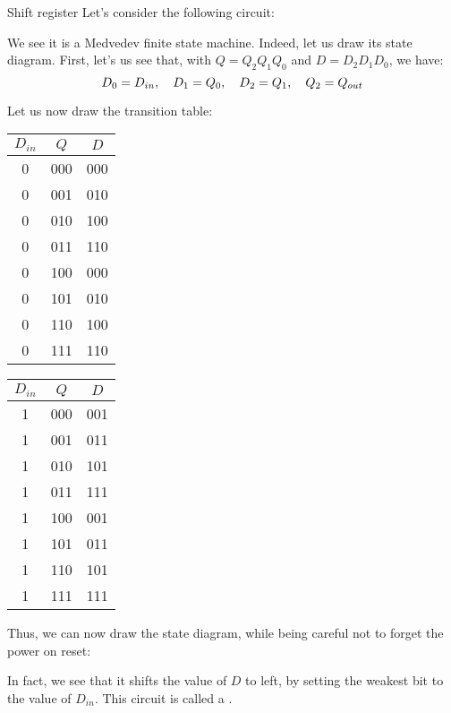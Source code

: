 \documentclass[a4paper]{article}
\begin{document}
\begin{parag}{Shift register}
    Let's consider the following circuit:

    We see it is a Medvedev finite state machine. Indeed, let us draw its state diagram. First, let's us see that, with $Q = Q_2 Q_1 Q_0$ and $D = D_2 D_1 D_0$, we have:
    \[D_0 = D_{in}, \quad D_1 = Q_0, \quad D_2 = Q_1, \quad Q_2 = Q_{out}\]

    Let us now draw the transition table:
    \begin{center}
    \begin{tabular}{cc|c}
        $D_{in}$ & $Q$ & $D$ \\
        \hline
        0 & 000 & 000 \\
        0 & 001 & 010 \\
        0 & 010 & 100 \\
        0 & 011 & 110 \\
        0 & 100 & 000 \\
        0 & 101 & 010 \\
        0 & 110 & 100 \\
        0 & 111 & 110 \\
    \end{tabular}
    \hspace{1em}
    \begin{tabular}{cc|c}
        $D_{in}$ & $Q$ & $D$ \\
        \hline
        1 & 000 & 001 \\
        1 & 001 & 011 \\
        1 & 010 & 101 \\
        1 & 011 & 111 \\
        1 & 100 & 001 \\
        1 & 101 & 011 \\
        1 & 110 & 101 \\
        1 & 111 & 111 \\
    \end{tabular}
    \end{center}

    Thus, we can now draw the state diagram, while being careful not to forget the power on reset:
    
    In fact, we see that it shifts the value of $D$ to left, by setting the weakest bit to the value of $D_{in}$. This circuit is called a .
\end{parag}
\end{document}
